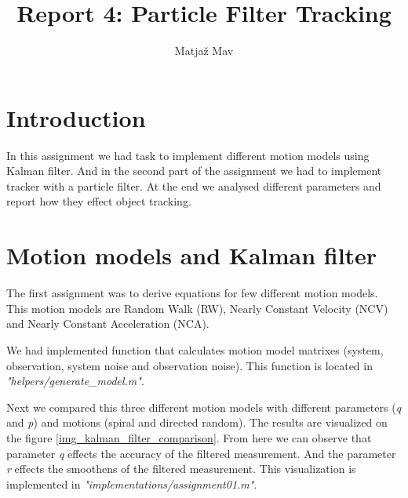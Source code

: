 \documentclass[runningheads]{llncs}
\begin{document}
% 
\title{Report 4: Particle Filter Tracking}
\author{Matjaž Mav}
%
\maketitle
%
 
\section{Introduction}
In this assignment we had task to implement different motion models using Kalman filter. And in the second part of the assignment we had to implement tracker with a particle filter. At the end we analysed different parameters and report how they effect object tracking.

\section{Motion models and Kalman filter}
The first assignment was to derive equations for few different motion models. This motion models are Random Walk (RW), Nearly Constant Velocity (NCV) and Nearly Constant Acceleration (NCA).

We had implemented function that calculates motion model matrixes (system, observation, system noise and observation noise). This function is located in \textit{"helpers/generate\_model.m"}.

Next we compared this three different motion models with different parameters (\textit{q} and \textit{p}) and motions (spiral and directed random). The results are visualized on the figure \ref{img_kalman_filter_comparison}. From here we can observe that parameter \textit{q} effects the accuracy of the filtered measurement. And the parameter \textit{r} effects the smoothens of the filtered measurement. This visualization is implemented in \textit{"implementations/assignment01.m"}.
\end{document}
